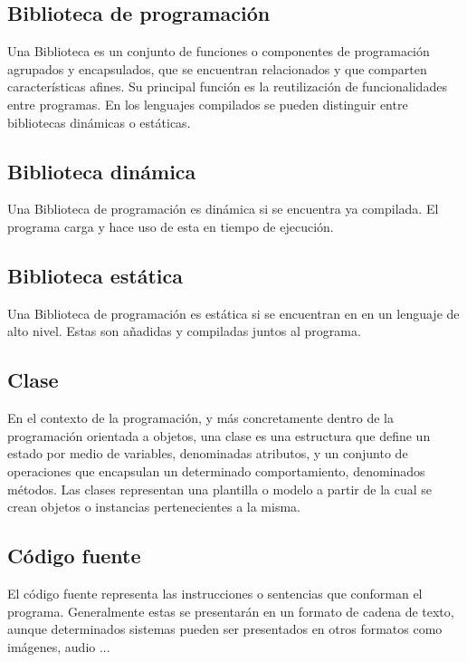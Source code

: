 \subsection {Biblioteca de programación}
Una Biblioteca es un conjunto de funciones o componentes de programación agrupados y encapsulados, que se encuentran relacionados y que comparten características afines. 
Su principal función es la reutilización de funcionalidades entre programas. En los lenguajes compilados se pueden distinguir entre bibliotecas dinámicas o estáticas.\\

\subsection {Biblioteca dinámica}
Una Biblioteca de programación es dinámica si se encuentra ya compilada. El programa carga y hace uso de esta en tiempo de ejecución.\\

\subsection {Biblioteca estática}
Una Biblioteca de programación es estática si se encuentran en en un lenguaje de alto nivel. Estas son añadidas y compiladas juntos al programa.\\

\subsection{Clase}
En el contexto de la programación, y más concretamente dentro de la programación orientada a objetos, una clase es una estructura que define un estado por medio de variables, 
denominadas atributos, y un conjunto de operaciones que encapsulan un determinado comportamiento, denominados métodos. Las clases representan una plantilla o modelo a partir de 
la cual se crean objetos o instancias pertenecientes a la misma. \\

\subsection {Código fuente}
El código fuente representa las instrucciones o sentencias que conforman el programa. Generalmente estas se presentarán en un formato de cadena de texto, aunque determinados sistemas
pueden ser presentados en otros formatos como imágenes, audio ...\\

